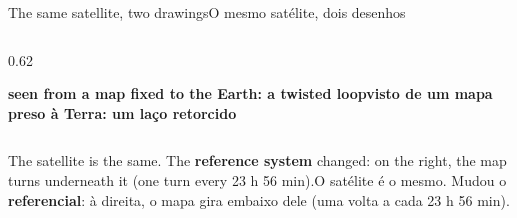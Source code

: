 \documentclass[aspectratio=169,11pt]{beamer}
\newcommand{\tr}[2]{\ifEN#2\else#1\fi}
\newcommand{\bnum}[1]{\textbf{\textcolor{mTeal}{#1}}}
\begin{document}
\begin{frame}{\tr{O mesmo satélite, dois desenhos}{The same satellite, two drawings}}
\begin{columns}[T]
\begin{column}{0.62\textwidth}
      \par
      {\scriptsize\textcolor{corFrame}{\textbf{\tr{visto de um mapa preso à Terra: um laço retorcido}{seen from a map fixed to the Earth: a twisted loop}}}}
    \end{column}
  \end{columns}
  \smallskip
  \begin{ideia}
    \scriptsize\tr{O satélite é o mesmo. Mudou o \bnum{referencial}: à direita, o mapa
    \alert{gira} embaixo dele (uma volta a cada 23 h 56 min).}{The satellite is the same. The
    \bnum{reference system} changed: on the right, the map \alert{turns} underneath it (one
    turn every 23 h 56 min).}
  \end{ideia}
\end{frame}
\end{document}
